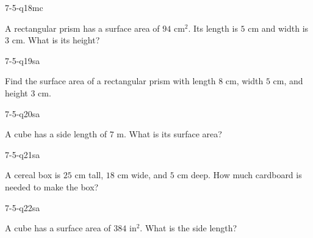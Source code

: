 \begin{practiceQuestion}{7-5-q18}{mc}
\begin{questionText}
A rectangular prism has a surface area of $94$ cm$^2$. Its length is $5$ cm and width is $3$ cm. What is its height?
\end{questionText}
\end{practiceQuestion}


\begin{practiceQuestion}{7-5-q19}{sa}
\begin{questionText}
Find the surface area of a rectangular prism with length $8$ cm, width $5$ cm, and height $3$ cm.
\end{questionText}
\end{practiceQuestion}

\begin{practiceQuestion}{7-5-q20}{sa}
\begin{questionText}
A cube has a side length of $7$ m. What is its surface area?
\end{questionText}
\end{practiceQuestion}

\begin{practiceQuestion}{7-5-q21}{sa}
\begin{questionText}
A cereal box is $25$ cm tall, $18$ cm wide, and $5$ cm deep. How much cardboard is needed to make the box?
\end{questionText}
\end{practiceQuestion}

\begin{practiceQuestion}{7-5-q22}{sa}
\begin{questionText}
A cube has a surface area of $384$ in$^2$. What is the side length?
\end{questionText}
\end{practiceQuestion}

